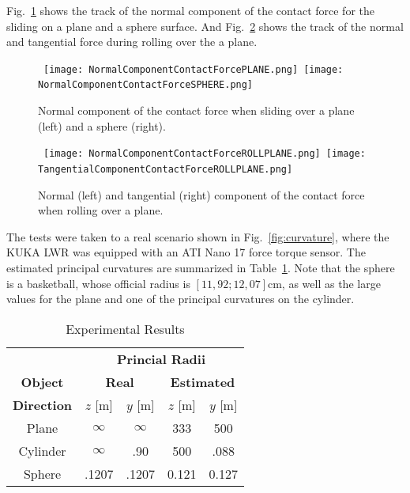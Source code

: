 Fig.~\ref{fig:NormCompContForce} shows the track of the normal component of the contact force for the sliding on a plane and a sphere surface. And Fig.~\ref{fig:TangCompForce} shows the track of the normal and tangential force during rolling over the a plane.

\begin{figure}[!t]
\centering
\mbox{
\texttt{[image: NormalComponentContactForcePLANE.png]}
\texttt{[image: NormalComponentContactForceSPHERE.png]}
}
\caption{Normal component of the contact force when sliding over a plane (left) and a sphere (right).}
\label{fig:NormCompContForce}
\end{figure}

\begin{figure}[!t]
\centering
\mbox{
\texttt{[image: NormalComponentContactForceROLLPLANE.png]}
\texttt{[image: TangentialComponentContactForceROLLPLANE.png]}
}
\caption{Normal (left) and tangential (right) component of the contact force when rolling over a plane.}
\label{fig:TangCompForce}
\end{figure}

The tests were taken to a real scenario shown in Fig.~\ref{fig:curvature}, where the KUKA LWR was equipped with an ATI Nano 17 force torque sensor. The estimated principal curvatures are summarized in Table~\ref{tab:results}. Note that the sphere is a basketball, whose official radius is $[11,92;12,07]$cm, as well as the large values for the plane and one of the principal curvatures on the cylinder.

\begin{table}
\centering
\caption{Experimental Results}
\label{tab:results}
\begin{tabular}{ccccc}
    \toprule
    & \multicolumn{4}{c}{\textbf{Princial Radii}}\\
    \textbf{Object} & \multicolumn{2}{c}{\textbf{Real}} & \multicolumn{2}{c}{\textbf{Estimated}}\\
    \textbf{Direction} & $z$ [m] & $y$ [m] & $z$ [m] & $y$ [m]\\
    \toprule
    Plane & $\infty$ & $\infty$ & 333 & 500 \\
    Cylinder & $\infty$ & .90 & 500 & .088 \\
    Sphere & .1207 & .1207 & 0.121 & 0.127 \\
    \bottomrule
\end{tabular}
\end{table}

